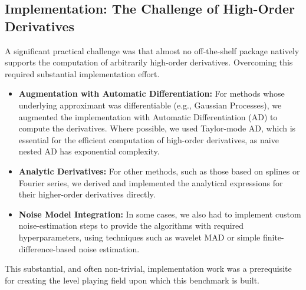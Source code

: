 \subsection{Implementation: The Challenge of High-Order Derivatives}
\label{sec:implementation_challenges}

A significant practical challenge was that almost no off-the-shelf package natively supports the computation of arbitrarily high-order derivatives. Overcoming this required substantial implementation effort.

\begin{itemize}
    \item \textbf{Augmentation with Automatic Differentiation:} For methods whose underlying approximant was differentiable (e.g., Gaussian Processes), we augmented the implementation with Automatic Differentiation (AD) to compute the derivatives. Where possible, we used Taylor-mode AD, which is essential for the efficient computation of high-order derivatives, as naive nested AD has exponential complexity.
    \item \textbf{Analytic Derivatives:} For other methods, such as those based on splines or Fourier series, we derived and implemented the analytical expressions for their higher-order derivatives directly.
    \item \textbf{Noise Model Integration:} In some cases, we also had to implement custom noise-estimation steps to provide the algorithms with required hyperparameters, using techniques such as wavelet MAD or simple finite-difference-based noise estimation.
\end{itemize}

This substantial, and often non-trivial, implementation work was a prerequisite for creating the level playing field upon which this benchmark is built.
